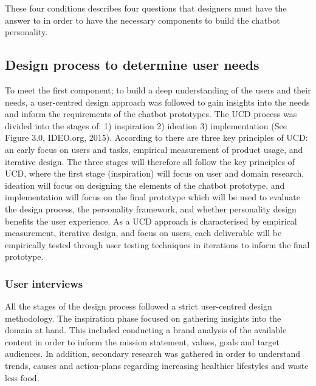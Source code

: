These four conditions describes four questions that designers must have the answer to in order to have the necessary components to build the chatbot personality.

\vspace{5mm} %

\subsection{Design process to determine user needs}

To meet the first component; to build a deep understanding of the users and their needs, a user-centred design approach was followed to gain insights into the needs and inform the requirements of the chatbot prototypes. The UCD process was divided into the stages of:  1) inspiration 2) ideation 3) implementation (See Figure 3.0, IDEO.org, 2015). According to \cite{Gould1985} there are three key principles of UCD: an early focus on users and tasks, empirical measurement of product usage, and iterative design. The three stages will therefore all follow the key principles of UCD, where the first stage (inspiration) will focus on user and domain research, ideation will focus on designing the elements of the chatbot prototype, and implementation will focus on the final prototype which will be used to evaluate the design process, the personality framework, and whether personality design benefits the user experience. As a UCD approach is characterised by empirical measurement, iterative design, and focus on users, each deliverable will be empirically tested through user testing techniques in iterations to inform the final prototype.

\vspace{2,5mm} %

    \subsubsection{User interviews}
    
   All the stages of the design process followed a strict user-centred design methodology. The inspiration phase focused on gathering insights into the domain at hand. This included conducting a brand analysis of the available content in order to inform the mission statement, values, goals and target audiences. In addition, secondary research was gathered in order to understand trends, causes and action-plans regarding increasing healthier lifestyles and waste less food.
   

